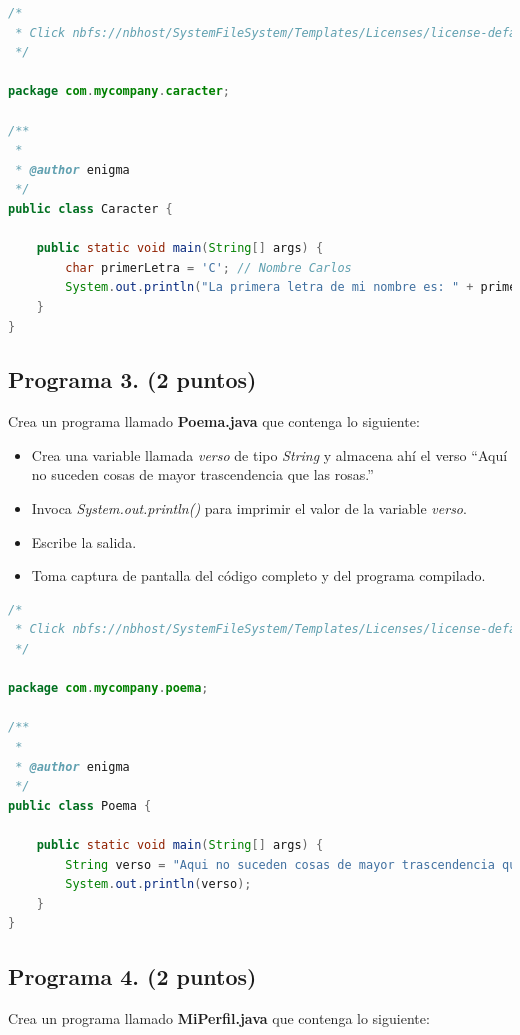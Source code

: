 \documentclass{article}
\begin{document}
\begin{lstlisting}[language=Java, caption={Código del programa Caracter.java}]
    /*
 * Click nbfs://nbhost/SystemFileSystem/Templates/Licenses/license-default.txt to change this license
 */

package com.mycompany.caracter;

/**
 *
 * @author enigma
 */
public class Caracter {

    public static void main(String[] args) {
        char primerLetra = 'C'; // Nombre Carlos
        System.out.println("La primera letra de mi nombre es: " + primerLetra);
    }
}

\end{lstlisting}
\newpage

\subsection*{Programa 3. (2 puntos)}
Crea un programa llamado \textbf{Poema.java} que contenga lo siguiente:

\begin{itemize}
    \item Crea una variable llamada \textit{verso} de tipo \textit{String} y almacena ahí el verso “Aquí no suceden cosas de mayor trascendencia que las rosas.”
    \item Invoca \textit{System.out.println()} para imprimir el valor de la variable \textit{verso}.
    \item Escribe la salida.
    \item Toma captura de pantalla del código completo y del programa compilado.
\end{itemize}

\begin{lstlisting}[language=Java, caption={Código del programa Poema.java}]
    /*
 * Click nbfs://nbhost/SystemFileSystem/Templates/Licenses/license-default.txt to change this license
 */

package com.mycompany.poema;

/**
 *
 * @author enigma
 */
public class Poema {

    public static void main(String[] args) {
        String verso = "Aqui no suceden cosas de mayor trascendencia que las rosas. ";
        System.out.println(verso);
    }
}

\end{lstlisting}


\newpage

\subsection*{Programa 4. (2 puntos)}
Crea un programa llamado \textbf{MiPerfil.java} que contenga lo siguiente:
\end{document}
